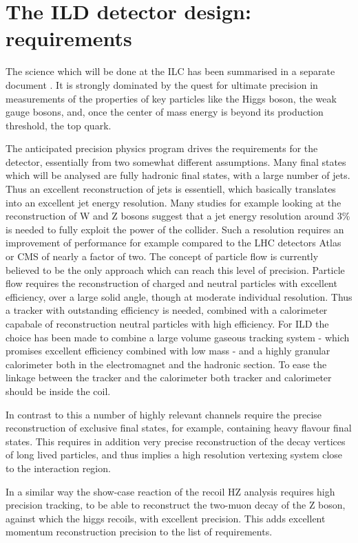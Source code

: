 \documentclass[%
 amsmath,amssymb,
 aps,
]{revtex4-1}
\begin{document}
\section{The ILD detector design: requirements}
The science which will be done at the ILC has been summarised in a separate document \cite{ILC-ESU1}. It is strongly dominated by the quest for ultimate precision in measurements of the properties of key particles like the Higgs boson, the weak gauge bosons, and, once the center of mass energy is beyond its production threshold, the top quark. 

The anticipated precision physics program drives the requirements for the detector, essentially from two somewhat different assumptions. Many final states which will be analysed are fully hadronic final states, with a large number of jets. Thus an excellent reconstruction of jets is essentiell, which basically translates into an excellent jet energy resolution. Many studies for example looking at the reconstruction of W and Z bosons suggest that a jet energy resolution around 3\% is needed to fully exploit the power of the collider. Such a resolution requires an improvement of performance for example compared to the LHC detectors Atlas or CMS of nearly a factor of two. The concept of particle flow is currently believed to be the only approach which can reach this level of precision. Particle flow requires the reconstruction of charged and neutral particles with excellent efficiency, over a large solid angle, though at moderate individual resolution. Thus a tracker with outstanding efficiency is needed, combined with a calorimeter capabale of reconstruction neutral particles with high efficiency. For ILD the choice has been made to combine a large volume gaseous tracking system - which promises excellent efficiency combined with low mass - and a highly granular calorimeter both in the electromagnet and the hadronic section. To ease the linkage between the tracker and the calorimeter both tracker and calorimeter should be inside the coil. 

In contrast to this a number of highly relevant channels require the precise reconstruction of exclusive final states, for example, containing heavy flavour final states. This requires in addition very precise reconstruction of the decay vertices of long lived particles, and thus implies a high resolution vertexing system close to the interaction region. 

In a similar way the show-case reaction of the recoil HZ analysis requires high precision tracking, to be able to reconstruct the two-muon decay of the Z boson, against which the higgs recoils, with excellent precision. This adds excellent momentum reconstruction precision to the list of requirements. 
\end{document}
